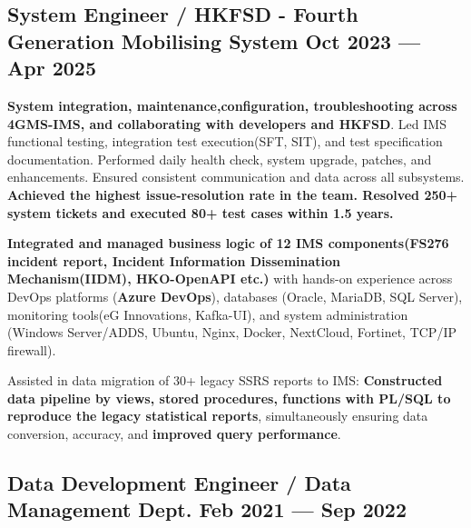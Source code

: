 \subsection{{System Engineer / HKFSD - Fourth Generation Mobilising System \hfill Oct 2023 --- Apr 2025}}
\begin{zitemize}
    \item \textbf{System integration, maintenance,configuration, troubleshooting across 4GMS-IMS, and collaborating with developers and HKFSD}. Led IMS functional testing, integration test execution(SFT, SIT), and test specification documentation. Performed daily health check, system upgrade, patches, and enhancements. Ensured consistent communication and data across all subsystems. \textbf{Achieved the highest issue-resolution rate in the team. Resolved 250+ system tickets and executed 80+ test cases within 1.5 years.}
    \item \textbf {Integrated and managed business logic of 12 IMS components(FS276 incident report, Incident Information Dissemination Mechanism(IIDM), HKO-OpenAPI etc.)} with hands-on experience across DevOps platforms (\textbf{Azure DevOps}), databases (Oracle, MariaDB, SQL Server), monitoring tools(eG Innovations, Kafka-UI), and system administration (Windows Server/ADDS, Ubuntu, Nginx, Docker, NextCloud, Fortinet, TCP/IP firewall).
    \item Assisted in data migration of 30+ legacy SSRS reports to IMS: \textbf{Constructed data pipeline by views, stored procedures, functions with PL/SQL to reproduce the legacy statistical reports}, simultaneously ensuring data conversion, accuracy, and \textbf{improved query performance}.
\end{zitemize}
\subsection{{Data Development Engineer / Data Management Dept. \hfill Feb 2021 --- Sep 2022}}

